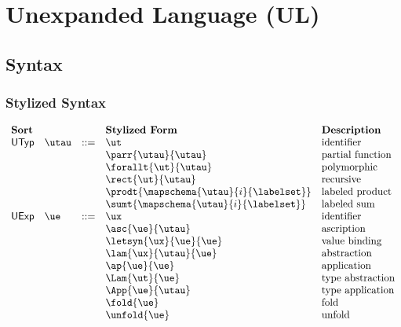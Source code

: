 \section{Unexpanded Language (UL)}\label{appendix:SES-uexps}
\subsection{Syntax}\label{appendix:SES-syntax}\label{appendix:SES-shared-forms}
\subsubsection{Stylized Syntax}
\[\begin{array}{lllllll}
\textbf{Sort} & &  
& \textbf{Stylized Form} & \textbf{Description}\\
\mathsf{UTyp} & \utau & ::= 
& \ut & \text{identifier}\\
&& 
& \parr{\utau}{\utau} & \text{partial function}\\
&&
& \forallt{\ut}{\utau} & \text{polymorphic}\\
&&
& \rect{\ut}{\utau} & \text{recursive}\\
&&
& \prodt{\mapschema{\utau}{i}{\labelset}} & \text{labeled product}\\
&&
& \sumt{\mapschema{\utau}{i}{\labelset}} & \text{labeled sum}\\
\mathsf{UExp} & \ue & ::= 
& \ux & \text{identifier}\\
&&
%
& \asc{\ue}{\utau} & \text{ascription}\\
&&
%
& \letsyn{\ux}{\ue}{\ue} & \text{value binding}\\
&&
& \lam{\ux}{\utau}{\ue} & \text{abstraction}\\
&&
& \ap{\ue}{\ue} & \text{application}\\
&&
& \Lam{\ut}{\ue} & \text{type abstraction}\\
&&
& \App{\ue}{\utau} & \text{type application}\\
&&
& \fold{\ue} & \text{fold}\\
&&
& \unfold{\ue} & \text{unfold}\\
&&

\end{array}\]
